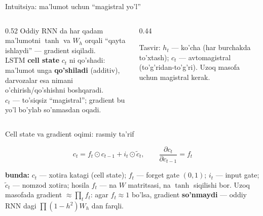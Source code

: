 \documentclass[aspectratio=169,11pt]{beamer}
\newcommand{\bunda}[1]{{\small\textbf{bunda:}\; #1}}
\begin{document}
\begin{frame}{Intuitsiya: ma'lumot uchun ``magistral yo'l''}
  \begin{columns}[T]
    \begin{column}{0.52\textwidth}
      \small
      Oddiy RNN da har qadam ma'lumotni $\tanh$ va $W_h$ orqali ``qayta ishlaydi''
      --- gradient siqiladi.\\[6pt]
      LSTM \textbf{cell state} $c_t$ ni qo'shadi: ma'lumot unga \textbf{qo'shiladi}
      (additiv), darvozalar esa nimani o'chirish/qo'shishni boshqaradi.\\[4pt]
      $c_t$ --- to'siqsiz ``magistral''; gradient bu yo'l bo'ylab so'nmasdan oqadi.
    \end{column}
    \begin{column}{0.44\textwidth}
      \begin{tcolorbox}[okbox,top=2pt,bottom=2pt]
        \footnotesize
        Tasvir: $h_t$ --- ko'cha (har burchakda to'xtash); $c_t$ --- avtomagistral
        (to'g'ridan-to'g'ri). Uzoq masofa uchun magistral kerak.
      \end{tcolorbox}
    \end{column}
  \end{columns}
\end{frame}

\begin{frame}{Cell state va gradient oqimi: rasmiy ta'rif}
  \begin{tcolorbox}[defbox,title=Ta'rif: cell state yangilanishi va uning hosilasi]
    \vspace{-0.4em}
    $$ c_t = f_t \odot c_{t-1} + i_t \odot \tilde{c}_t,
       \qquad \frac{\partial c_t}{\partial c_{t-1}} = f_t $$
  \end{tcolorbox}
  \vspace{2pt}
  \bunda{$c_t$ --- xotira katagi (cell state); $f_t$ --- forget gate $(0,1)$;
  $i_t$ --- input gate; $\tilde{c}_t$ --- nomzod xotira; hosila $f_t$ --- na $W$
  matritsasi, na $\tanh$ siqilishi bor.}
  \vspace{4pt}
  \footnotesize Uzoq masofada gradient $\approx \prod_t f_t$: agar $f_t\approx 1$
  bo'lsa, gradient \textbf{so'nmaydi} --- oddiy RNN dagi $\prod(1-h^2)W_h$ dan farqli.
\end{frame}
\end{document}
